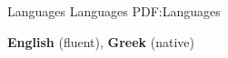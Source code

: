 
\Section
{Languages}
{Languages}
{PDF:Languages}

\BulletItem
\textbf{English} (fluent), \textbf{Greek} (native)
